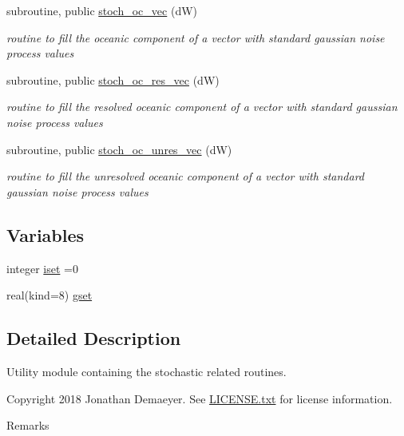 \begin{DoxyCompactItemize}
subroutine, public \hyperlink{namespacestoch__mod_a16dca233d3cc2bae3d2dd878ffa09573}{stoch\+\_\+oc\+\_\+vec} (dW)
\begin{DoxyCompactList}\small\item\em routine to fill the oceanic component of a vector with standard gaussian noise process values \end{DoxyCompactList}\item 
subroutine, public \hyperlink{namespacestoch__mod_a5755bfeff5833b9a8bda92ec2d940f0b}{stoch\+\_\+oc\+\_\+res\+\_\+vec} (dW)
\begin{DoxyCompactList}\small\item\em routine to fill the resolved oceanic component of a vector with standard gaussian noise process values \end{DoxyCompactList}\item 
subroutine, public \hyperlink{namespacestoch__mod_a54d51f19303ab07c03b861022a4f149e}{stoch\+\_\+oc\+\_\+unres\+\_\+vec} (dW)
\begin{DoxyCompactList}\small\item\em routine to fill the unresolved oceanic component of a vector with standard gaussian noise process values \end{DoxyCompactList}\end{DoxyCompactItemize}
\subsection*{Variables}
\begin{DoxyCompactItemize}
\item 
integer \hyperlink{namespacestoch__mod_a266187af9a49e162926a5ef2d67e141a}{iset} =0
\item 
real(kind=8) \hyperlink{namespacestoch__mod_a15f89f8abf449fad0aea548852af1e60}{gset}
\end{DoxyCompactItemize}


\subsection{Detailed Description}
Utility module containing the stochastic related routines. 

\begin{DoxyCopyright}{Copyright}
2018 Jonathan Demaeyer. See \hyperlink{LICENSE_8txt}{L\+I\+C\+E\+N\+S\+E.\+txt} for license information. 
\end{DoxyCopyright}
\begin{DoxyRemark}{Remarks}

\end{DoxyRemark}


